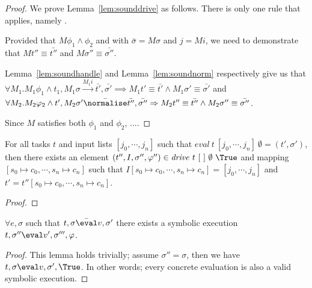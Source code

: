 \begin{proof}
  We prove Lemma~\ref{lem:sounddrive} as follows.
  There is only one rule that applies, namely .

  Provided that $M\phi_1\land\phi_2$ and  with $\bar{\sigma}=M\sigma$ and $j=M i$,
  we need to demonstrate that $M t'' \equiv \bar{t''}$ and $M\sigma''\equiv \bar{\sigma''}$.


  Lemma~\ref{lem:soundhandle} and Lemma~\ref{lem:soundnorm} respectively give us that\\
$\forall M_1 . M_1 \phi_1 \land t_1,M_1\sigma \xrightarrow[]{M_1 i} \bar{t'},\bar{\sigma'}\implies M_1 t'\equiv\bar{t'}\land M_1\sigma' \equiv \bar{\sigma'}$ and \\
$\forall M_2 . M_2 \phi_2 \land t',M_2\sigma' \bar{\normalise} \bar{t''},\bar{\sigma''}\implies M_2 t''\equiv\bar{t''}\land M_2\sigma'' \equiv \bar{\sigma''}$.

Since $M$ satisfies both $\phi_1$ and $\phi_2$, .... 

\end{proof}




\begin{theorem}
For all tasks $t$ and input lists $[j_0,\cdots,j_n]$ such that $\mathit{eval}\ t\ [j_0,\cdots,j_n]\ \emptyset = (t',\sigma')$,
then there exists an element $(t'',I,\sigma'',\phi'')\in \mathit{drive}\ t\ [\ ]\ \emptyset\ \True$ and mapping $[s_0\mapsto c_0,\cdots,s_n\mapsto c_n]$ such that
$I[s_0\mapsto c_0,\cdots,s_n\mapsto c_n]=[j_0,\cdots,j_n]$ and $t'=t''[s_0\mapsto c_0,\cdots,s_n\mapsto c_n]$.
  \label{thm:complete}
\end{theorem}

\begin{proof}
\end{proof}

\begin{lemma}
  $\forall e,\sigma$ such that $t,\sigma \bar{\eval}v,\sigma'$
  there exists a symbolic execution $t,\sigma''\eval v',\sigma''',\phi$.
\end{lemma}

\begin{proof}
This lemma holds trivially; assume $\sigma''=\sigma$, then we have $t,\sigma\eval v,\sigma',\True$.
In other words; every concrete evaluation is also a valid symbolic execution.
\end{proof}

